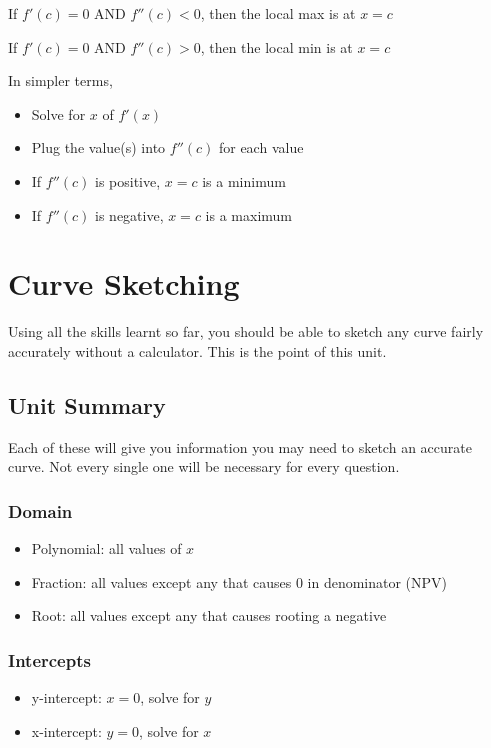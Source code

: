 \documentclass[a4paper,12pt]{article}
\begin{document}
\begin{center}
If $f'(c) = 0$ AND $f''(c) < 0$, then the local max is at $x = c$

If $f'(c) = 0$ AND $f''(c) > 0$, then the local min is at $x = c$
\end{center}

In simpler terms,
\begin{itemize}
    \item{Solve for $x$ of $f'(x)$}
    \item{Plug the value(s) into $f''(c)$ for each value}
    \item{If $f''(c)$ is positive, $x = c$ is a minimum}
    \item{If $f''(c)$ is negative, $x = c$ is a maximum}
\end{itemize}

\pagebreak

\section{Curve Sketching}
Using all the skills learnt so far, you should be able to sketch any curve fairly accurately without a calculator. This is the point of this unit.

\subsection{Unit Summary}
Each of these will give you information you may need to sketch an accurate curve. Not every single one will be necessary for every question.

\subsubsection{Domain}
\begin{itemize}
    \item{Polynomial: all values of $x$}
    \item{Fraction: all values except any that causes 0 in denominator (NPV)}
    \item{Root: all values except any that causes rooting a negative}
\end{itemize}

\subsubsection{Intercepts}
\begin{itemize}
    \item{y-intercept: $x=0$, solve for $y$}
    \item{x-intercept: $y=0$, solve for $x$}
\end{itemize}
\end{document}

